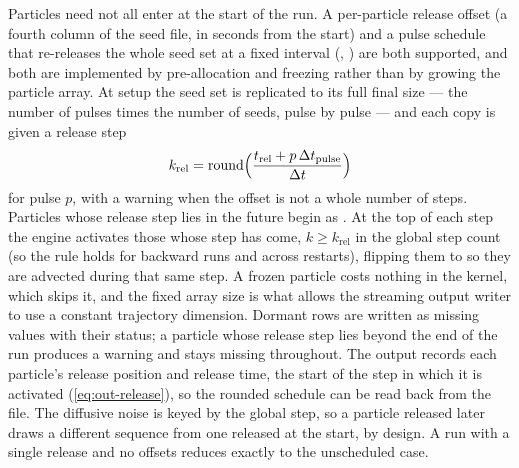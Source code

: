 Particles need not all enter at the start of the run. A per-particle release offset (a fourth column of the
seed file, in seconds from the start) and a pulse schedule that re-releases the whole seed set at a fixed
interval (, ) are both supported, and both are implemented by
pre-allocation and freezing rather than by growing the particle array. At setup the seed set is replicated to
its full final size --- the number of pulses times the number of seeds, pulse by pulse --- and each copy is given
a release step
\begin{equation}\label{eq:life-release}
  k_{\text{rel}}=\operatorname{round}\Bigl(\frac{t_{\text{rel}}+p\,\Delta t_{\text{pulse}}}{\Delta t}\Bigr)
\end{equation}
for pulse $p$, with a warning when the offset is not a whole number of steps. Particles whose release step
lies in the future begin as . At the top of each step the engine activates those whose
step has come, $k\ge k_{\text{rel}}$ in the global step count (so the rule holds for backward runs and across
restarts), flipping them to  so they are advected during that same step. A frozen particle costs
nothing in the kernel, which skips it, and the fixed array size is what allows the streaming output writer to
use a constant trajectory dimension. Dormant rows are written as missing values with their status; a particle
whose release step lies beyond the end of the run produces a warning and stays missing throughout. The output
records each particle's release position and release time, the start of the step in which it is activated
(\cref{eq:out-release}), so the rounded schedule can be read back from the file. The
diffusive noise is keyed by the global step, so a particle released later draws a different sequence from one
released at the start, by design. A run with a single release and no offsets reduces exactly to the
unscheduled case.

